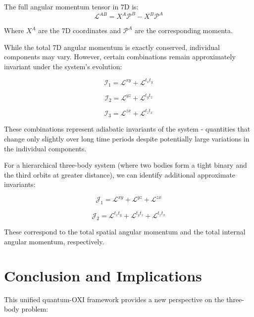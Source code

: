\documentclass{article}
\begin{document}
The full angular momentum tensor in 7D is:
\begin{equation}
\mathcal{L}^{AB} = X^A \mathcal{P}^B - X^B \mathcal{P}^A
\end{equation}

Where $X^A$ are the 7D coordinates and $\mathcal{P}^A$ are the corresponding momenta.

While the total 7D angular momentum is exactly conserved, individual components may vary. However, certain combinations remain approximately invariant under the system's evolution:

\begin{equation}
\mathcal{I}_1 = \mathcal{L}^{xy} + \mathcal{L}^{t_x t_y}
\end{equation}

\begin{equation}
\mathcal{I}_2 = \mathcal{L}^{yz} + \mathcal{L}^{t_y t_z}
\end{equation}

\begin{equation}
\mathcal{I}_3 = \mathcal{L}^{zx} + \mathcal{L}^{t_z t_x}
\end{equation}

These combinations represent adiabatic invariants of the system - quantities that change only slightly over long time periods despite potentially large variations in the individual components.

For a hierarchical three-body system (where two bodies form a tight binary and the third orbits at greater distance), we can identify additional approximate invariants:

\begin{equation}
\mathcal{J}_1 = \mathcal{L}^{xy} + \mathcal{L}^{yz} + \mathcal{L}^{zx}
\end{equation}

\begin{equation}
\mathcal{J}_2 = \mathcal{L}^{t_x t_y} + \mathcal{L}^{t_y t_z} + \mathcal{L}^{t_z t_x}
\end{equation}

These correspond to the total spatial angular momentum and the total internal angular momentum, respectively.

\section{Conclusion and Implications}

This unified quantum-OXI framework provides a new perspective on the three-body problem:
\end{document}
